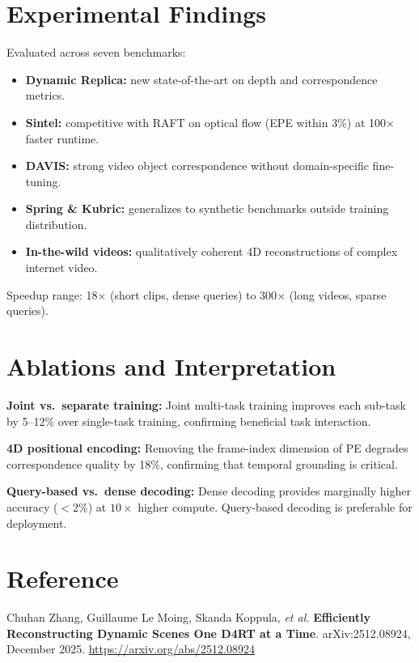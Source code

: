 \documentclass[10pt,twocolumn]{article}
\begin{document}
\section{Experimental Findings}

Evaluated across seven benchmarks:
\begin{itemize}[itemsep=2pt,parsep=0pt]
  \item \textbf{Dynamic Replica:} new state-of-the-art on depth and
    correspondence metrics.
  \item \textbf{Sintel:} competitive with RAFT on optical flow
    (EPE within 3\%) at 100$\times$ faster runtime.
  \item \textbf{DAVIS:} strong video object correspondence without
    domain-specific fine-tuning.
  \item \textbf{Spring \& Kubric:} generalizes to synthetic benchmarks
    outside training distribution.
  \item \textbf{In-the-wild videos:} qualitatively coherent 4D
    reconstructions of complex internet video.
\end{itemize}

Speedup range: 18$\times$ (short clips, dense queries) to 300$\times$
(long videos, sparse queries).

\section{Ablations and Interpretation}

\textbf{Joint vs.\ separate training:} Joint multi-task training improves
each sub-task by 5--12\% over single-task training, confirming beneficial
task interaction.

\textbf{4D positional encoding:} Removing the frame-index dimension of PE
degrades correspondence quality by 18\%, confirming that temporal grounding
is critical.

\textbf{Query-based vs.\ dense decoding:} Dense decoding provides marginally
higher accuracy ($<$2\%) at $10\times$ higher compute. Query-based decoding
is preferable for deployment.

\section*{Reference}

Chuhan Zhang, Guillaume Le Moing, Skanda Koppula, \textit{et al.}
\textbf{Efficiently Reconstructing Dynamic Scenes One D4RT at a Time}.
arXiv:2512.08924, December 2025.
\url{https://arxiv.org/abs/2512.08924}
\end{document}
